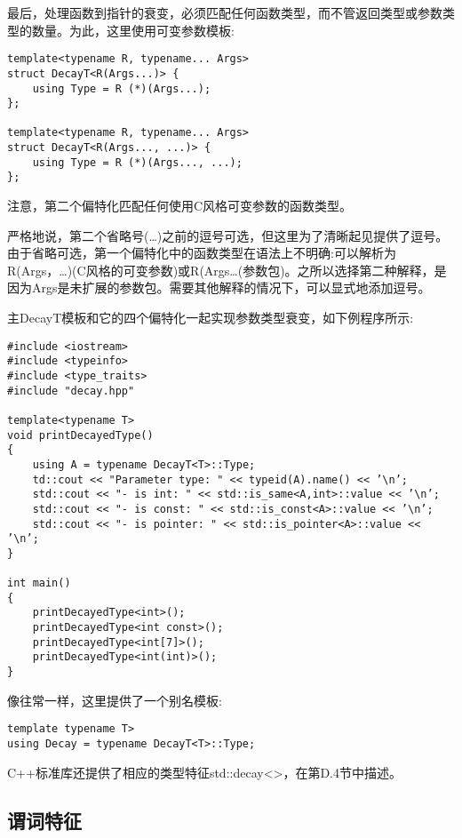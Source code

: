 最后，处理函数到指针的衰变，必须匹配任何函数类型，而不管返回类型或参数类型的数量。为此，这里使用可变参数模板:

\begin{lstlisting}[style=styleCXX]
template<typename R, typename... Args>
struct DecayT<R(Args...)> {
	using Type = R (*)(Args...);
};

template<typename R, typename... Args>
struct DecayT<R(Args..., ...)> {
	using Type = R (*)(Args..., ...);
};
\end{lstlisting}

注意，第二个偏特化匹配任何使用C风格可变参数的函数类型。

\begin{tcolorbox}[colback=webgreen!5!white,colframe=webgreen!75!black]
\hspace*{0.75cm}严格地说，第二个省略号(…)之前的逗号可选，但这里为了清晰起见提供了逗号。由于省略可选，第一个偏特化中的函数类型在语法上不明确:可以解析为R(Args，…)(C风格的可变参数)或R(Args…(参数包)。之所以选择第二种解释，是因为Args是未扩展的参数包。需要其他解释的情况下，可以显式地添加逗号。
\end{tcolorbox}

主DecayT模板和它的四个偏特化一起实现参数类型衰变，如下例程序所示:

\begin{lstlisting}[style=styleCXX]
#include <iostream>
#include <typeinfo>
#include <type_traits>
#include "decay.hpp"

template<typename T>
void printDecayedType()
{
	using A = typename DecayT<T>::Type;
	td::cout << "Parameter type: " << typeid(A).name() << ’\n’;
	std::cout << "- is int: " << std::is_same<A,int>::value << ’\n’;
	std::cout << "- is const: " << std::is_const<A>::value << ’\n’;
	std::cout << "- is pointer: " << std::is_pointer<A>::value << ’\n’;
}

int main()
{
	printDecayedType<int>();
	printDecayedType<int const>();
	printDecayedType<int[7]>();
	printDecayedType<int(int)>();
}
\end{lstlisting}

像往常一样，这里提供了一个别名模板:

\begin{lstlisting}[style=styleCXX]
template typename T>
using Decay = typename DecayT<T>::Type;
\end{lstlisting}

C++标准库还提供了相应的类型特征std::decay<>，在第D.4节中描述。

\subsection{谓词特征}

